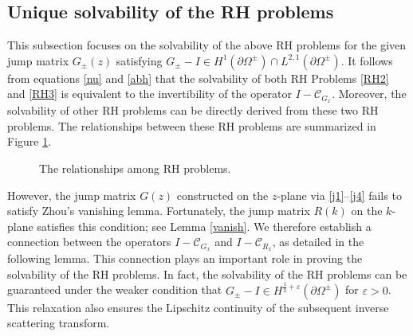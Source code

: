 \documentclass[preprint,compress,12pt]{elsarticle}
\numberwithin{equation}{section}
\begin{document}
\subsection{Unique solvability of the RH problems}\label{sub35}
This subsection focuses on the solvability of the above RH problems for the given jump matrix $G_{\pm}(z)$ satisfying $G_{\pm}-I \in H^{1}(\partial\Omega^{\pm})\cap L^{2,1}(\partial\Omega^{\pm})$.
It follows from equations \eqref{nu} and \eqref{abh} that the solvability of both RH Problems \ref{RH2} and \ref{RH3} is equivalent to the invertibility of the operator $I-\mathcal{C}_{G_{x}}$. Moreover, the solvability of other RH problems can be directly derived from these two RH problems. The relationships between these RH problems are summarized in Figure \ref{ft}.

\begin{figure}
 \centering
{}
\caption{The relationships among RH problems.}
\label{ft}
\end{figure}

However, the jump matrix $G(z)$ constructed on the $z$-plane via \eqref{j1}--\eqref{j4} fails to satisfy Zhou's vanishing lemma. Fortunately, the jump matrix $R(k)$ on the $k$-plane satisfies this condition; see Lemma \ref{vanish}. We therefore establish a connection between
the operators $I-\mathcal{C}_{G_{x}}$ and $I-\mathcal{C}_{R_{x}}$, as detailed in the following lemma. This connection plays an important role in proving the solvability of the RH problems. In fact, the solvability of the RH problems can be guaranteed under the weaker condition that $G_{\pm}-I\in H^{\frac{1}{2}+\varepsilon}(\partial\Omega^{\pm})$ for $\varepsilon>0$. This relaxation also ensures the Lipschitz continuity of the subsequent inverse scattering transform.
\end{document}
